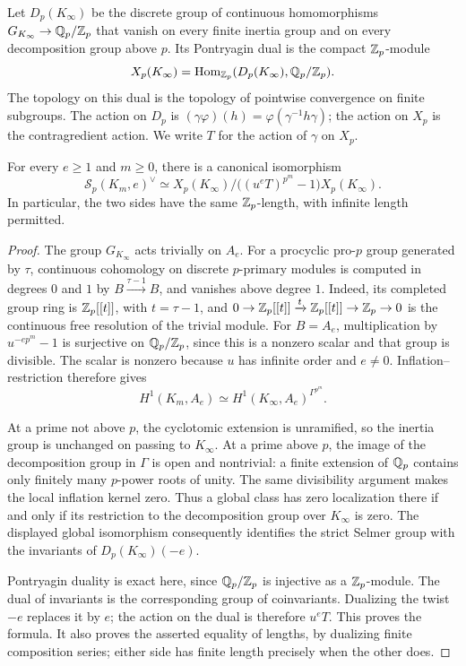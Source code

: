 Let $D_p(K_\infty)$ be the discrete group of continuous homomorphisms
$G_{K_\infty}\to\mathbb Q_p/\mathbb Z_p$ that vanish on every finite inertia
group and on every decomposition group above $p$. Its Pontryagin
dual is the compact $\mathbb Z_p$-module
\[
 X_p(K_\infty)=
 \operatorname{Hom}_{\mathbb Z_p}(D_p(K_\infty),\mathbb Q_p/\mathbb Z_p).
\]
The topology on this dual is the topology of pointwise convergence
on finite subgroups. The action on $D_p$ is
$(\gamma\varphi)(h)=\varphi(\gamma^{-1}h\gamma)$; the action on
$X_p$ is the contragredient action. We write $T$ for the action of
$\gamma$ on $X_p$.

\begin{proposition}
\label{ct-descent}
For every $e\ge1$ and $m\ge0$, there is a canonical isomorphism
\[
 \mathcal S_p(K_m,e)^\vee\simeq
 X_p(K_\infty)\big/
       \bigl((u^eT)^{p^m}-1\bigr)X_p(K_\infty).
\]
In particular, the two sides have the same $\mathbb Z_p$-length, with
infinite length permitted.
\end{proposition}

\begin{proof}
The group $G_{K_\infty}$ acts trivially on $A_e$.
For a procyclic pro-$p$ group generated by $\tau$, continuous
cohomology on discrete $p$-primary modules is computed in degrees
$0$ and $1$ by $B\xrightarrow{\tau-1}B$, and vanishes above
degree $1$. Indeed, its completed group ring is $\mathbb Z_p[[t]]$,
with $t=\tau-1$, and
$0\to\mathbb Z_p[[t]]\xrightarrow{t}\mathbb Z_p[[t]]\to\mathbb Z_p\to0$
is the continuous free resolution of the trivial module.
For $B=A_e$, multiplication by
$u^{-ep^m}-1$ is surjective on $\mathbb Q_p/\mathbb Z_p$, since this is a
nonzero scalar and that group is divisible. The scalar is nonzero
because $u$ has infinite order and $e\ne0$. Inflation--restriction
therefore gives
\[
 H^1(K_m,A_e)\simeq
 H^1(K_\infty,A_e)^{\Gamma^{p^m}}.
\]

At a prime not above $p$, the cyclotomic extension is unramified,
so the inertia group is unchanged on passing to $K_\infty$.
At a prime above $p$, the image of the decomposition group in
$\Gamma$ is open and nontrivial: a finite extension of $\mathbb Q_p$
contains only finitely many $p$-power roots of unity. The same
divisibility argument makes the local inflation kernel zero.
Thus a global class has zero localization there if and only if its
restriction to the decomposition group over $K_\infty$ is zero.
The displayed global isomorphism consequently identifies the strict
Selmer group with the invariants of $D_p(K_\infty)(-e)$.

Pontryagin duality is exact here, since $\mathbb Q_p/\mathbb Z_p$ is injective
as a $\mathbb Z_p$-module. The dual of invariants is the corresponding
group of coinvariants. Dualizing the twist $-e$ replaces it by $e$;
the action on the dual is therefore $u^eT$. This proves the formula.
It also proves the asserted equality of lengths, by dualizing finite
composition series; either side has finite length precisely when
the other does.
\end{proof}

